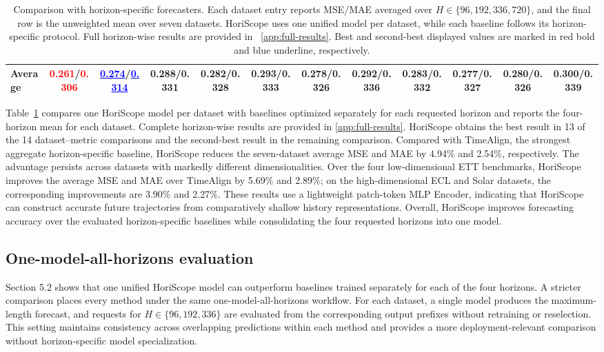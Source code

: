 \documentclass[final,3p,times]{elsarticle}
\begin{document}
\begin{table}[t]
{\begin{tabular}{l|ccccccccccc}
\midrule
Average & \textcolor{red}{\textbf{0.261}}/\textcolor{red}{\textbf{0.306}} & \textcolor{blue}{\underline{0.274}}/\textcolor{blue}{\underline{0.314}} & 0.288/0.331 & 0.282/0.328 & 0.293/0.333 & 0.278/0.326 & 0.292/0.336 & 0.283/0.332 & 0.277/0.327 & 0.280/0.326 & 0.300/0.339 \\
\bottomrule
\end{tabular}%
}
\caption{Comparison with horizon-specific forecasters. Each dataset entry reports MSE/MAE averaged over $H\in\{96,192,336,720\}$, and the final row is the unweighted mean over seven datasets. HoriScope uses one unified model per dataset, while each baseline follows its horizon-specific protocol. Full horizon-wise results are provided in ~\ref{app:full-results}. Best and second-best displayed values are marked in red bold and blue underline, respectively.}
\label{tab:main_horiscope}
\end{table}


Table~\ref{tab:main_horiscope} compares one HoriScope model per dataset with baselines optimized separately for each requested horizon and reports the four-horizon mean for each dataset. Complete horizon-wise results are provided in \ref{app:full-results}. HoriScope obtains the best result in 13 of the 14 dataset--metric comparisons and the second-best result in the remaining comparison. Compared with TimeAlign, the strongest aggregate horizon-specific baseline, HoriScope reduces the seven-dataset average MSE and MAE by 4.94\% and 2.54\%, respectively. The advantage persists across datasets with markedly different dimensionalities. Over the four low-dimensional ETT benchmarks, HoriScope improves the average MSE and MAE over TimeAlign by 5.69\% and 2.89\%; on the high-dimensional ECL and Solar datasets, the corresponding improvements are 3.90\% and 2.27\%. These results use a lightweight patch-token MLP Encoder, indicating that HoriScope can construct accurate future trajectories from comparatively shallow history representations. Overall, HoriScope improves forecasting accuracy over the evaluated horizon-specific baselines while consolidating the four requested horizons into one model.

\subsection{One-model-all-horizons evaluation}
\label{sec:one-model-comparison}


Section 5.2 shows that one unified HoriScope model can outperform baselines trained separately for each of the four horizons. A stricter comparison places every method under the same one-model-all-horizons workflow. For each dataset, a single model produces the maximum-length forecast, and requests for $H\in\{96,192,336\}$ are evaluated from the corresponding output prefixes without retraining or reselection. This setting maintains consistency across overlapping predictions within each method and provides a more deployment-relevant comparison without horizon-specific model specialization.
\end{document}
